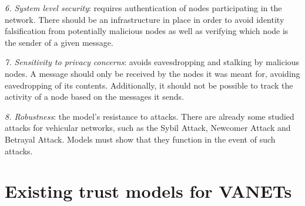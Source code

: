 \textit{6. System level security}: requires authentication of nodes participating in the network.
There should be an infrastructure in place in order to avoid identity falsification from potentially malicious nodes as well as verifying which node is the sender of a given message.


\textit{7. Sensitivity to privacy concerns}: avoids eavesdropping and stalking by malicious nodes.
A message should only be received by the nodes it was meant for, avoiding eavedropping of its contents.
Additionally, it should not be possible to track the activity of a node based on the messages it sends.


\textit{8. Robustness}: the model's resistance to attacks.
There are already some studied attacks for vehicular networks, such as the Sybil Attack, Newcomer Attack and Betrayal Attack.
Models must show that they function in the event of such attacks.


\section{Existing trust models for VANETs}
 
